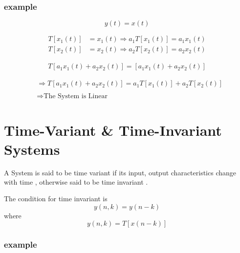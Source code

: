 \documentclass[12pt]{article}
\begin{document}
\newpage

\subsubsection{example}




$$
y(t) = x(t)
$$


\begin{align*}
T[x_{1}(t)] &=  x_{1}(t) \Rightarrow a_{1} T[x_{1}(t)] = a_{1} x_{1}(t)  \\ 
T[x_{2}(t)] &=  x_{2}(t) \Rightarrow a_{2} T[x_{2}(t)] = a_{2} x_{2}(t)
\end{align*}





\begin{align*}
T[ a_{1}x_{1}(t) + a_{2}x_{2}(t) ] = [ a_{1}x_{1}(t) + a_{2}x_{2}(t) ]
\end{align*}





\begin{align*}
&\Rightarrow T[ a_{1}x_{1}(t) + a_{2}x_{2}(t) ] = a_{1} T[x_{1}(t)] + a_{2} T[x_{2}(t)] \\ \\
&\Rightarrow \text{The System is Linear}
\end{align*}











\section{Time-Variant \& Time-Invariant Systems}



A System is said to be time variant if its input, output characteristics change with time , otherwise said to be time invariant .

The condition for time invariant is 
$$
y(n,k) = y(n-k)
$$
where
$$
y(n,k) = T[x(n-k)]
$$







\subsubsection{example}
\end{document}
